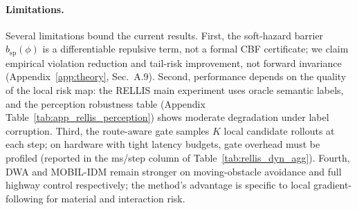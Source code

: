 \paragraph{Limitations.}
Several limitations bound the current results.
First, the soft-hazard barrier $b_{\mathrm{sp}}(\phi)$ is a
differentiable repulsive term, not a formal CBF certificate; we claim
empirical violation reduction and tail-risk improvement, not forward
invariance (Appendix~\ref{app:theory}, Sec.\ A.9).
Second, performance depends on the quality of the local risk map: the
RELLIS main experiment uses oracle semantic labels, and the perception
robustness table (Appendix Table~\ref{tab:app_rellis_perception})
shows moderate degradation under label corruption.
Third, the route-aware gate samples $K$ local candidate rollouts at
each step; on hardware with tight latency budgets, gate overhead
must be profiled (reported in the ms/step column of
Table~\ref{tab:rellis_dyn_agg}).
Fourth, DWA and MOBIL-IDM remain stronger on moving-obstacle avoidance
and full highway control respectively; the method's advantage is
specific to local gradient-following for material and interaction
risk.

\clearpage
